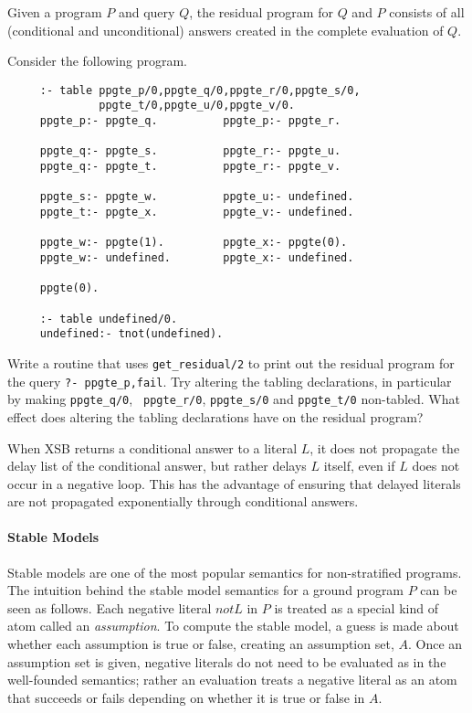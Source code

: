 Given a program $P$ and query $Q$, the residual program for $Q$ and
$P$ consists of all (conditional and unconditional) answers created in
the complete evaluation of $Q$\@.  

\begin{exercise} \label{ex:pos-delay}
Consider the following program.
\begin{verbatim}
     :- table ppgte_p/0,ppgte_q/0,ppgte_r/0,ppgte_s/0,
              ppgte_t/0,ppgte_u/0,ppgte_v/0.
     ppgte_p:- ppgte_q.          ppgte_p:- ppgte_r.

     ppgte_q:- ppgte_s.          ppgte_r:- ppgte_u.
     ppgte_q:- ppgte_t.          ppgte_r:- ppgte_v.

     ppgte_s:- ppgte_w.          ppgte_u:- undefined.
     ppgte_t:- ppgte_x.          ppgte_v:- undefined.

     ppgte_w:- ppgte(1).         ppgte_x:- ppgte(0).
     ppgte_w:- undefined.        ppgte_x:- undefined.

     ppgte(0).

     :- table undefined/0.
     undefined:- tnot(undefined).
\end{verbatim}
Write a routine that uses {\tt get\_residual/2} to print out the
residual program for the query {\tt ?- ppgte\_p,fail}.  Try altering the
tabling declarations, in particular by making {\tt ppgte\_q/0}, {\tt
ppgte\_r/0}, {\tt ppgte\_s/0} and {\tt ppgte\_t/0} non-tabled.  What
effect does altering the tabling declarations have on the residual
program?
\end{exercise}

When XSB returns a conditional answer to a literal $L$, it does not
propagate the delay list of the conditional answer, but rather delays
$L$ itself, even if $L$ does not occur in a negative loop.  This has
the advantage of ensuring that delayed literals are not propagated
exponentially through conditional answers.

\paragraph*{Stable Models}

Stable models are one of the most popular semantics for non-stratified
programs.  The intuition behind the stable model semantics for a
ground program $P$ can be seen as follows.  Each negative literal $not
L$ in $P$ is treated as a special kind of atom called an {\em
assumption}.  To compute the stable model, a guess is made about
whether each assumption is true or false, creating an assumption set,
$A$\@.  Once an assumption set is given, negative literals do not need
to be evaluated as in the well-founded semantics; rather an evaluation
treats a negative literal as an atom that succeeds or fails depending
on whether it is true or false in $A$\@.


